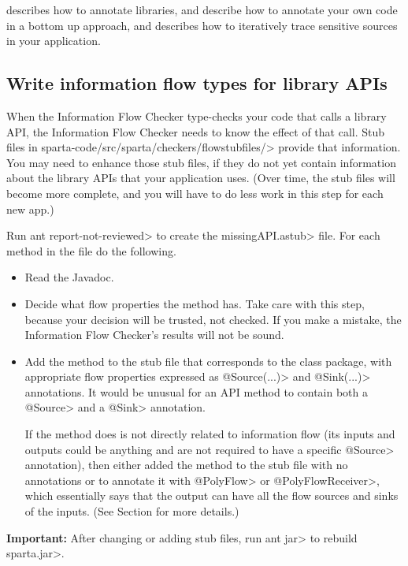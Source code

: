  describes how to annotate libraries,
 and  describe how to
annotate your own code in a bottom up approach, and  describes
how to iteratively trace sensitive sources in your application.


\subsection{Write information flow types for library APIs\label{flow-task-annotate-apis}}

When the Information Flow Checker type-checks your code that calls a library API, the
Information Flow Checker needs to know the effect of that call.  
Stub files in \<sparta-code/src/sparta/checkers/flowstubfiles/> provide
that information.  You may need to enhance those stub files, if they do not
yet contain information about the library APIs that your application uses.
(Over time, the stub files will become more complete, and you will have to
do less work in this step for each new app.)

Run \<ant report-not-reviewed> to create the \<missingAPI.astub> file. For each method in the 
file do the following.  
\begin{itemize}
\item
Read the Javadoc.
\item
Decide what flow properties the method has.  Take care with this step,
because your decision will be trusted, not checked.  If you make a mistake,
the Information Flow Checker's results will not be sound.
\item
Add the method to the stub file that corresponds to the class package, with
appropriate flow properties expressed as \<@Source(...)> and
\<@Sink(...)> annotations.
It would be unusual for an API method to contain both a \<@Source>
and a \<@Sink> annotation.

If the method does is not directly related to information flow (its inputs
and outputs could be anything and are not required to have a specific
\<@Source> annotation), then either added the method to the stub file with no 
annotations or to annotate it with \<@PolyFlow> or \<@PolyFlowReceiver>, 
which essentially says that the
output can have all the flow sources and sinks of the inputs.
(See Section  for more details.)

\end{itemize}

\noindent
\textbf{Important:}
After changing or adding stub files, run \<ant jar> to rebuild \<sparta.jar>.



